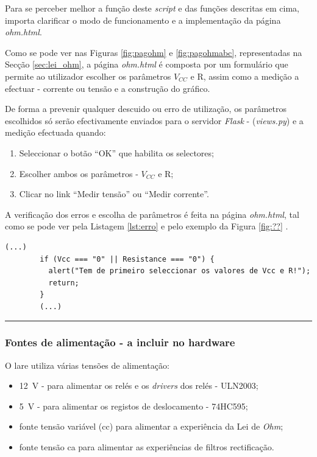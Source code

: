Para se perceber melhor a função deste \textit{script} e das funções descritas em cima, importa clarificar o modo de funcionamento e a implementação da página \textit{ohm.html}.

Como se pode ver nas Figuras \ref{fig:pagohm} e \ref{fig:pagohmabc}, representadas na Secção \ref{sec:lei_ohm}, a página \textit{ohm.html} é composta por um formulário que permite ao utilizador escolher os parâmetros $V_{CC}$ e R, assim como a medição a efectuar - corrente ou tensão e a construção do gráfico.

De forma a prevenir qualquer descuido ou erro de utilização, os parâmetros escolhidos só serão efectivamente enviados para o servidor \textit{Flask} - (\textit{views.py}) e a medição efectuada quando:
\begin{enumerate}
	\item Seleccionar o botão ``OK'' que habilita os selectores;
	\item Escolher ambos os parâmetros - $V_{CC}$ e R;
	\item Clicar no link ``Medir tensão'' ou ``Medir corrente''.
\end{enumerate}

A verificação dos erros e escolha de parâmetros é feita na página \textit{ohm.html}, tal como se pode ver pela Listagem \ref{lst:erro} e pelo exemplo da Figura \ref{fig:??} .

\begin{center}
	\begin{minipage}{0.7\linewidth}
		\begin{lstlisting}[language=html, caption=Erro na página \textit{ohm.html}, label=lst:erro]
		(...)
        if (Vcc === "0" || Resistance === "0") {
          alert("Tem de primeiro seleccionar os valores de Vcc e R!");
          return;
        }
		(...)
	\end{lstlisting}
	\end{minipage}
\end{center}

\hrule

\subsubsection{Fontes de alimentação - a incluir no hardware}
O \acrshort{lare} utiliza várias tensões de alimentação:
\begin{itemize}
	\item \SI{12}{\volt} - para alimentar os relés e os \textit{drivers} dos relés - ULN2003;
	\item \SI{5}{\volt} - para alimentar os registos de deslocamento - 74HC595;
	\item fonte tensão variável (\acrshort{cc}) para alimentar a experiência da Lei de \textit{Ohm};
	\item fonte tensão \acrshort{ca} para alimentar as experiências de filtros rectificação.
\end{itemize}

